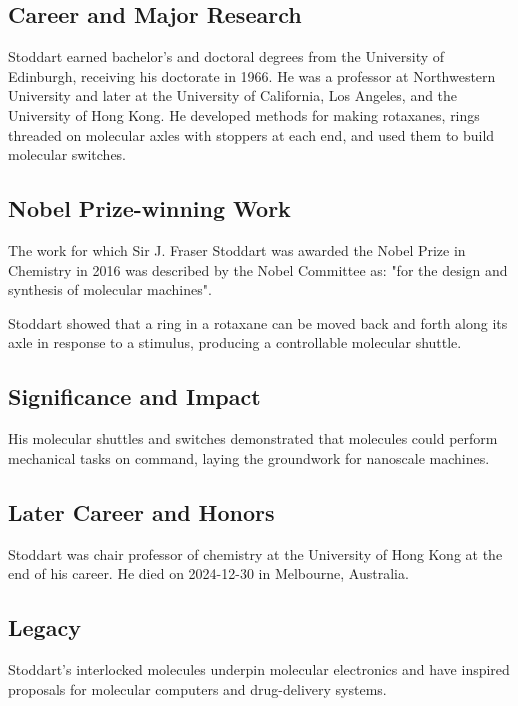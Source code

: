 \subsection*{Career and Major Research}

Stoddart earned bachelor's and doctoral degrees from the University of Edinburgh, receiving his doctorate in 1966. He was a professor at Northwestern University and later at the University of California, Los Angeles, and the University of Hong Kong. He developed methods for making rotaxanes, rings threaded on molecular axles with stoppers at each end, and used them to build molecular switches.

\subsection*{Nobel Prize-winning Work}

The work for which Sir J. Fraser Stoddart was awarded the Nobel Prize in Chemistry in 2016 was described by the Nobel Committee as: "for the design and synthesis of molecular machines".

Stoddart showed that a ring in a rotaxane can be moved back and forth along its axle in response to a stimulus, producing a controllable molecular shuttle.

\subsection*{Significance and Impact}

His molecular shuttles and switches demonstrated that molecules could perform mechanical tasks on command, laying the groundwork for nanoscale machines.

\subsection*{Later Career and Honors}

Stoddart was chair professor of chemistry at the University of Hong Kong at the end of his career. He died on 2024-12-30 in Melbourne, Australia.

\subsection*{Legacy}

Stoddart's interlocked molecules underpin molecular electronics and have inspired proposals for molecular computers and drug-delivery systems.


